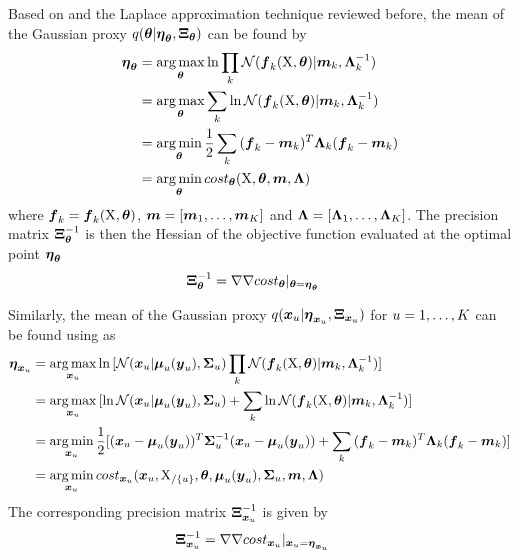 Based on  and the Laplace approximation technique reviewed before, the mean of the Gaussian proxy $q(\boldsymbol{\theta}\vert\boldsymbol{\eta}_{\boldsymbol{\theta}},\boldsymbol{\Xi}_{\boldsymbol{\theta}})$ can be found by
\begin{align}
    \dymetatheta
    & = 
    \argmax_{\dymtheta}{
        \ln{
            \prod_k{\mathcal{N}(\dymfkX{k}\vert\dymmk{k},\dyminvLambdak{k})}
        }
    }
    \nonumber
    \\
    & = 
    \argmax_{\dymtheta}{
        \sum_k{
            \ln{\mathcal{N}(\dymfkX{k}\vert\dymmk{k},\dyminvLambdak{k})}
        }}
    \nonumber
    \\
    & =
    \argmin_{\dymtheta}{
        \frac{1}{2}\sum_k{
            (\dymfkXshort{k} - \dymmk{k})^T\dymLambdak{k}(\dymfkXshort{k} - \dymmk{k})
        }
    }
    \nonumber
    \\
    & = 
    \argmin_{\dymtheta}{
        cost_{\dymtheta}(\dymX,\dymtheta,\dymm,\dymLambda)
    }
    \label{eq-laplace-theta-cost}
\end{align}
where $\boldsymbol{f}_{k} = \boldsymbol{f}_{k}(\mathrm{X}, \boldsymbol{\theta})$, $\boldsymbol{m} = [\boldsymbol{m}_{1},\dots,\boldsymbol{m}_{K}]$ and $\boldsymbol{\Lambda} = [\boldsymbol{\Lambda}_{1},\dots,\boldsymbol{\Lambda}_{K}]$.
The precision matrix $\boldsymbol{\Xi}_{\boldsymbol{\theta}}^{-1}$ is then the Hessian of the objective function   evaluated at the optimal point $\boldsymbol{\eta}_{\boldsymbol{\theta}}$
\begin{align}
    \dymXitheta^{-1} 
    & = 
    \nabla\nabla cost_{\dymtheta}\vert_{\dymtheta = \dymetatheta}  
    \label{eq-laplace-theta-covariance}    
\end{align}

Similarly, the mean of the Gaussian proxy $q(\boldsymbol{x}_{u}\vert\boldsymbol{\eta}_{\boldsymbol{x}_{u}},\boldsymbol{\Xi}_{\boldsymbol{x}_{u}})$ for $u = 1,\dots,K$ can be found using  as 
\begin{align}
    \dymetaxk{u}
    & =     
    \argmax_{\dymxk{u}}{
        \ln{[
            \mathcal{N}(\dymxk{u}\vert\dymmuk{u},\dymSigmak{u})\prod_k{\mathcal{N}(\dymfkX{k}\vert\dymmk{k},\dyminvLambdak{k})}
        ]}
    }
    \nonumber
    \\
    & =     
    \argmax_{\dymxk{u}}{[
        \ln{\mathcal{N}(\dymxk{u}\vert\dymmuk{u},\dymSigmak{u})} 
        + \sum_k{
            \ln{\mathcal{N}(\dymfkX{k}\vert\dymmk{k},\dyminvLambdak{k})}
        }]}
    \nonumber
    \\
    & =
    \argmin_{\dymxk{u}}{
        \frac{1}{2}[(\dymxk{u} - \dymmuk{u})^T\dyminvSigmak{u}(\dymxk{u} - \dymmuk{u})
        + \sum_k{
            (\dymfkXshort{k} - \dymmk{k})^T\dymLambdak{k}(\dymfkXshort{k} - \dymmk{k})        
        }]
    }
    \nonumber
    \\
    & =
    \argmin_{\dymxk{u}}{
        cost_{\dymxk{u}}(\dymxk{u},\dymXwithoutk{u},\dymtheta,\dymmuk{u},\dymSigmak{u},\dymm,\dymLambda)
    }
    \label{eq-laplace-xu-cost}
\end{align}
The corresponding precision matrix $\boldsymbol{\Xi}_{\boldsymbol{x}_{u}}^{-1}$ is given by 
\begin{align}
    \dymXixk{u}^{-1} 
    & = 
    \nabla\nabla cost_{\dymxk{u}}\vert_{\dymxk{u} = \dymetaxk{u}}
    \label{eq-laplace-xu-covariance}
\end{align}


